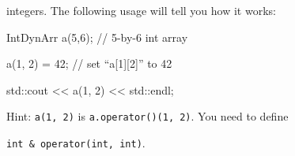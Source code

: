integers. The following usage will tell you how it works:

\begin{console}

IntDynArr a(5,6); // 5-by-6 int array

a(1, 2) = 42;     // set ``a[1][2]'' to 42

std::cout << a(1, 2) << std::endl;

\end{console}

Hint: \texttt{a(1, 2)} is \texttt{a.operator()(1, 2)}. You need to define

\texttt{int \& operator(int, int)}.

